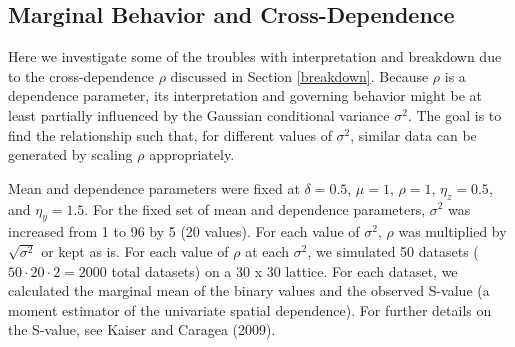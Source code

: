 \documentclass[12pt, a4paper, twoside]{article}
\begin{document}
\subsection{Marginal Behavior and Cross-Dependence}
Here we investigate some of the troubles with interpretation and breakdown due to the cross-dependence $\rho$ discussed in Section \ref{breakdown}. Because $\rho$ is a dependence parameter, its interpretation and governing behavior might be at least partially influenced by the Gaussian conditional variance $\sigma^2$. The goal is to find the relationship such that, for different values of $\sigma^2$, similar data can be generated by scaling $\rho$ appropriately.

Mean and dependence parameters were fixed at $\delta=0.5$, $\mu=1$, $\rho=1$, $\eta_z=0.5$, and $\eta_y=1.5$. For the fixed set of mean and dependence parameters, $\sigma^2$ was increased from 1 to 96 by 5 (20 values). For each value of $\sigma^2$, $\rho$ was multiplied by $\sqrt{\sigma^2}$ or kept as is. For each value of $\rho$ at each $\sigma^2$,  we simulated 50 datasets ($50\cdot20\cdot2=2000$ total datasets) on a 30 x 30 lattice. For each dataset, we calculated the marginal mean of the binary values and the observed S-value (a moment estimator of the univariate spatial dependence). For further details on the S-value, see Kaiser and Caragea (2009).
\end{document}
